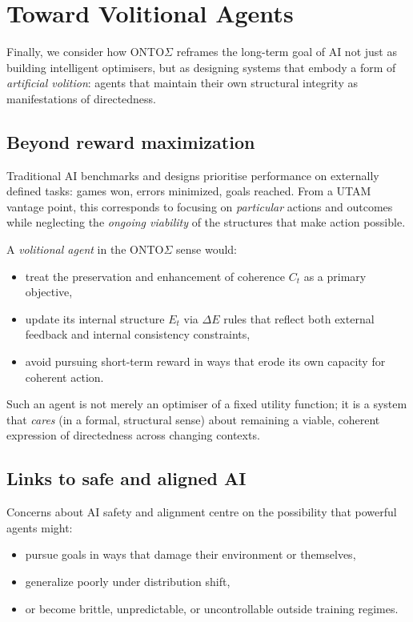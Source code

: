 \documentclass[12pt,a4paper]{report}
\begin{document}
\section{Toward Volitional Agents}

Finally, we consider how ONTO$\Sigma$ reframes the long-term goal of AI not just as building intelligent optimisers, but as designing systems that embody a form of \emph{artificial volition}: agents that maintain their own structural integrity as manifestations of directedness.

\subsection*{Beyond reward maximization}

Traditional AI benchmarks and designs prioritise performance on externally defined tasks: games won, errors minimized, goals reached. From a UTAM vantage point, this corresponds to focusing on \emph{particular} actions and outcomes while neglecting the \emph{ongoing viability} of the structures that make action possible.

A \emph{volitional agent} in the ONTO$\Sigma$ sense would:

\begin{itemize}[leftmargin=2em]
    \item treat the preservation and enhancement of coherence \(C_t\) as a primary objective,
    \item update its internal structure \(E_t\) via $\Delta E$ rules that reflect both external feedback and internal consistency constraints,
    \item avoid pursuing short-term reward in ways that erode its own capacity for coherent action.
\end{itemize}

Such an agent is not merely an optimiser of a fixed utility function; it is a system that \emph{cares} (in a formal, structural sense) about remaining a viable, coherent expression of directedness across changing contexts.

\subsection*{Links to safe and aligned AI}

Concerns about AI safety and alignment centre on the possibility that powerful agents might:

\begin{itemize}[leftmargin=2em]
    \item pursue goals in ways that damage their environment or themselves,
    \item generalize poorly under distribution shift,
    \item or become brittle, unpredictable, or uncontrollable outside training regimes.
\end{itemize}
\end{document}
